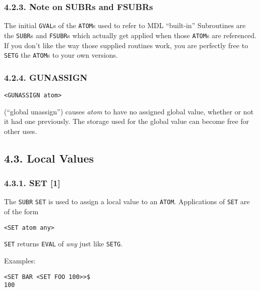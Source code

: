 \documentclass[a4paper,]{article}
\begin{document}
\subsubsection{4.2.3. Note on SUBRs and FSUBRs}\label{note-on-subrs-and-fsubrs}

The initial \texttt{GVAL}s of the \texttt{ATOM}s used to refer to MDL ``built-in'' Subroutines are the
\texttt{SUBR}s and \texttt{FSUBR}s which actually get applied when those
\texttt{ATOM}s are referenced. If you don't like the way those supplied routines work, you are perfectly free to
\texttt{SETG} the \texttt{ATOM}s to your own versions.

\subsubsection{4.2.4. GUNASSIGN}\label{gunassign}

\begin{verbatim}
<GUNASSIGN atom>
\end{verbatim}

 (``global unassign'') causes \emph{atom} to have no assigned global value, whether or not
it had one previously. The storage used for the global value can become free for other uses.

\subsection{4.3. Local Values}\label{local-values}

\subsubsection{4.3.1. SET {[}1{]}}\label{set-1}

The \texttt{SUBR} \texttt{SET} is used to assign a local value to an \texttt{ATOM}. Applications
of \texttt{SET} are of the form

\begin{verbatim}
<SET atom any>
\end{verbatim}

\texttt{SET} returns \texttt{EVAL} of \emph{any} just like \texttt{SETG}.

Examples:

\begin{verbatim}
<SET BAR <SET FOO 100>>$
100
\end{verbatim}
\end{document}

